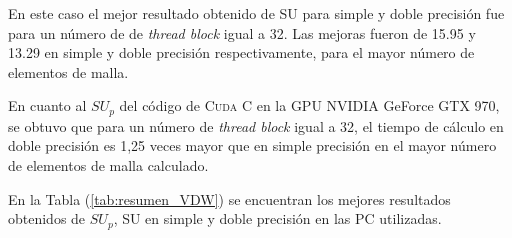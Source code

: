En este caso el mejor resultado obtenido de SU para simple y doble precisión fue para un número de  de \textit{thread block} igual a 32. Las mejoras fueron de 15.95 y 13.29 en simple y doble precisión respectivamente, para el mayor número de elementos de malla. 

En cuanto al $SU_p$ del código de \textsc{Cuda C} en la GPU NVIDIA GeForce GTX 970, se obtuvo que para un número de \textit{thread block} igual a 32, el tiempo de cálculo en doble precisión es 1,25 veces mayor que en simple precisión en el mayor número de elementos de malla calculado. 

En la Tabla (\ref{tab:resumen_VDW}) se encuentran los mejores resultados obtenidos de $SU_p$, SU en simple y doble precisión en las PC utilizadas.

